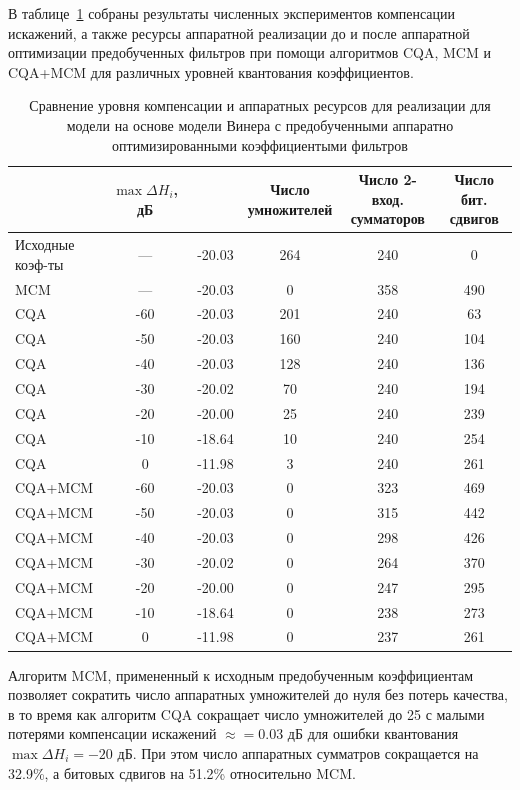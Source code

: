 В таблице~\ref{tab:algorithms} собраны результаты численных экспериментов компенсации искажений, а также ресурсы аппаратной реализации до и после аппаратной оптимизации предобученных фильтров при помощи алгоритмов CQA, MCM и CQA+MCM для различных уровней квантования коэффициентов.
\begin{table}[h!]
	\centering
	\caption{Сравнение уровня компенсации и аппаратных ресурсов для реализации для модели на основе модели Винера с предобученными аппаратно оптимизированными коэффициентыми фильтров}
	\label{tab:algorithms}
	\begin{tabular}{|l|c|c|c|c|c|}
		\hline
		\makecell{Алгоритм} & \makecell{$\max \Delta H_i$,\\ дБ} & \makecell{NMSE, дБ} & \makecell{Число \\ умножителей} & \makecell{Число 2-вход. \\ сумматоров} & \makecell{Число бит. \\ сдвигов} \\
		\hline
		\makecell{Исходные \\ коэф-ты} & --- & -20.03 & 264 & 240 & 0 \\
		\hline
		MCM & --- & -20.03 & 0 & 358 & 490 \\
		\hline
		CQA & -60 & -20.03 & 201 & 240 & 63 \\
		\hline
		CQA & -50 & -20.03 & 160 & 240 & 104 \\
		\hline
		CQA & -40 & -20.03 & 128 & 240 & 136 \\
		\hline
		CQA & -30 & -20.02 & 70 & 240 & 194 \\
		\hline
		CQA & -20 & -20.00 & 25 & 240 & 239 \\
		\hline
		CQA & -10 & -18.64 & 10 & 240 & 254 \\
		\hline
		CQA & 0 & -11.98 & 3 & 240 & 261 \\
		\hline
		CQA+MCM & -60 & -20.03 & 0 & 323 & 469 \\
		\hline
		CQA+MCM & -50 & -20.03 & 0 & 315 & 442 \\
		\hline
		CQA+MCM & -40 & -20.03 & 0 & 298 & 426 \\
		\hline
		CQA+MCM & -30 & -20.02 & 0 & 264 & 370 \\
		\hline
		CQA+MCM & -20 & -20.00 & 0 & 247 & 295 \\
		\hline
		CQA+MCM & -10 & -18.64 & 0 & 238 & 273 \\
		\hline
		CQA+MCM & 0 & -11.98 & 0 & 237 & 261 \\
		\hline
	\end{tabular}
\end{table}
Алгоритм MCM, примененный к исходным предобученным коэффициентам позволяет сократить число аппаратных умножителей до нуля без потерь качества, в то время как алгоритм CQA сокращает число умножителей до 25 с малыми потерями компенсации искажений $\approx=0.03$ дБ для ошибки квантования $\max \Delta H_i=-20$ дБ. При этом число аппаратных сумматров сокращается на 32.9\%, а битовых сдвигов на 51.2\% относительно MCM. 

